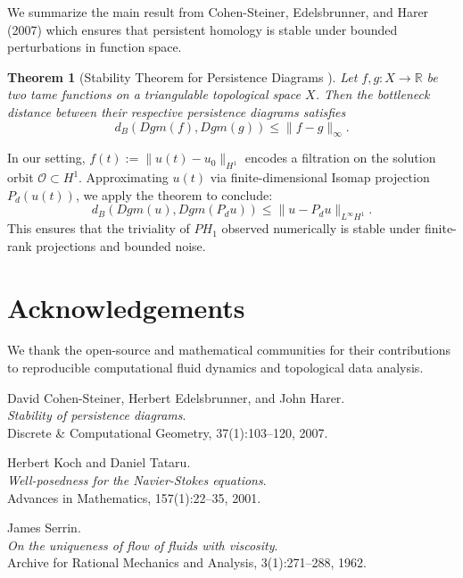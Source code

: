 \documentclass[11pt]{article}
\newtheorem{theorem}{Theorem}[section]
\theoremstyle{definition}
\begin{document}
We summarize the main result from Cohen-Steiner, Edelsbrunner, and Harer (2007) which ensures that persistent homology is stable under bounded perturbations in function space.

\begin{theorem}[Stability Theorem for Persistence Diagrams \cite{CohenSteiner2007}]
Let $f, g : X \to \mathbb{R}$ be two tame functions on a triangulable topological space $X$. Then the bottleneck distance between their respective persistence diagrams satisfies
\[
d_B(Dgm(f), Dgm(g)) \le \|f - g\|_\infty.
\]
\end{theorem}

\noindent In our setting, $f(t) := \|u(t) - u_0\|_{H^1}$ encodes a filtration on the solution orbit $\mathcal O \subset H^1$. Approximating $u(t)$ via finite-dimensional Isomap projection $P_d(u(t))$, we apply the theorem to conclude:
\[
d_B(Dgm(u), Dgm(P_d u)) \le \|u - P_d u\|_{L^\infty H^1}.
\]
This ensures that the triviality of $PH_1$ observed numerically is stable under finite-rank projections and bounded noise.

\section*{Acknowledgements}
We thank the open-source and mathematical communities for their contributions to reproducible computational fluid dynamics and topological data analysis.
\begin{thebibliography}{9}

David Cohen-Steiner, Herbert Edelsbrunner, and John Harer.\\
\textit{Stability of persistence diagrams}.\\
Discrete \& Computational Geometry, 37(1):103--120, 2007.

Herbert Koch and Daniel Tataru.\\
\textit{Well-posedness for the Navier-Stokes equations}.\\
Advances in Mathematics, 157(1):22--35, 2001.

James Serrin.\\
\textit{On the uniqueness of flow of fluids with viscosity}.\\
Archive for Rational Mechanics and Analysis, 3(1):271--288, 1962.

\end{thebibliography}
\end{document}
